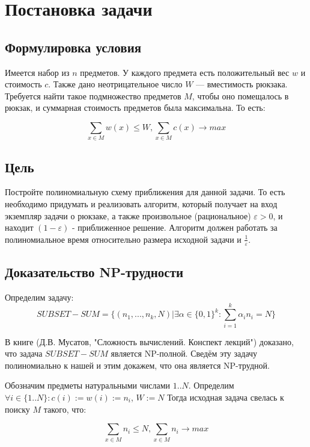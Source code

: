 \documentclass{article}
\begin{document}
	
	
	\section{Постановка задачи}
	
	\subsection{Формулировка условия}
	
	Имеется набор из $n$ предметов. У каждого предмета есть положительный вес $w$ и стоимость $c$. Также дано неотрицательное число $W$ — вместимость рюкзака.
	Требуется найти такое подмножество предметов $M$, чтобы оно помещалось в рюкзак, и суммарная стоимость предметов была максимальна. То есть:
	
	$$\sum\limits_{x \in M} {w(x)} \leq W, \sum\limits_{x \in M} {c(x)} \rightarrow max$$ 
	
	\subsection{Цель}
	
	Постройте полиномиальную схему приближения для данной задачи. То есть необходимо придумать и реализовать алгоритм, который получает на вход экземпляр задачи о рюкзаке, а также произвольное (рациональное) $\varepsilon > 0$, и находит $(1 - \varepsilon)$ - приближенное решение. Алгоритм должен работать за полиномиальное время относительно размера исходной задачи и $\frac{1}{\varepsilon}$.
	
	\subsection{Доказательство NP-трудности}
	
	Определим задачу: $$SUBSET-SUM = \{(n_1 , . . . , n_k , N ) | \exists \alpha \in \{0, 1\}^k : \sum\limits_{i = 1}^{k} {\alpha_i n_i} = N \}$$  
	
	В книге (Д.В. Мусатов, "Сложность вычислений. Конспект лекций") доказано, что задача $SUBSET-SUM$ является NP-полной. Сведём эту задачу полиномиально к нашей и этим докажем, что она является NP-трудной. 
	
	Обозначим предметы натуральными числами $1 .. N$. Определим $\forall i \in \{1..N\} : c(i) := w(i) := n_i$, $W := N$ Тогда исходная задача свелась к поиску $M$ такого, что:
	
	$$\sum\limits_{x \in M} {n_i} \leq N, \sum\limits_{x \in M} {n_i} \rightarrow max$$ 
	
\end{document}
